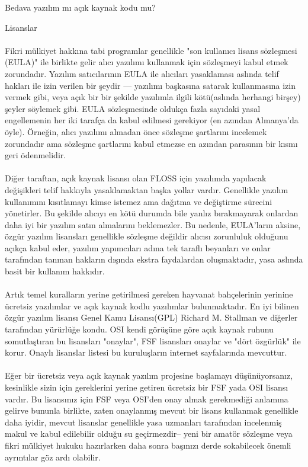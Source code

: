 \documentclass[10pt,a5paper]{book}
\begin{document}
\begin{section}{Bedava yazılım mı açık kaynak kodu mu?}
\begin{subsection}{Lisanslar}
\paragraph{}{Fikri mülkiyet hakkına tabi programlar genellikle "son kullanıcı lisans sözleşmesi (EULA)" ile birlikte gelir alıcı yazılımı kullanmak için  sözleşmeyi kabul etmek zorundadır. Yazılım satıcılarının EULA ile  alıcıları yasaklaması aslında telif hakları ile izin verilen bir şeydir ---
yazılımı başkasına  satarak kullanmasına izin vermek gibi, veya açık bir bir şekilde yazılımla ilgili kötü(aslında herhangi birşey) şeyler söylemek gibi.
EULA  sözleşmesinde oldukça fazla sayıdaki yasal engellemenin her iki tarafça da kabul edilmesi gerekiyor (en azından Almanya'da öyle). Örneğin, alıcı yazılımı almadan önce sözleşme şartlarını incelemek zorundadır ama sözleşme şartlarını kabul etmezse en azından parasının bir kısmı geri ödenmelidir.}
\paragraph{}{Diğer taraftan, açık kaynak lisansı olan FLOSS için yazılımda yapılacak değişikleri telif hakkıyla yasaklamaktan başka yollar vardır. Genellikle yazılım kullanımını kısıtlamayı kimse istemez ama dağıtma ve değiştirme sürecini yönetirler. Bu şekilde alıcıyı en kötü durumda bile yanlız bırakmayarak onlardan daha iyi bir yazılım satın almalarını beklemezler. Bu nedenle, EULA'ların aksine, özgür yazılım lisansları genellikle sözleşme değildir alıcısı zorunluluk olduğunu açıkça kabul eder, yazılım yapımcıları adına tek taraflı beyanları ve onlar tarafından tanınan hakların dışında ekstra faydalardan oluşmaktadır, yasa aslında basit bir kullanım hakkıdır.}
\paragraph{}{Artık temel kuralların yerine getirilmesi gereken hayvanat bahçelerinin yerinine ücretsiz yazılımlar ve  açık kaynak kodlu yazılımlar bulunmaktadır. En iyi bilinen özgür yazılım lisansı Genel Kamu Lisansı(GPL)  Richard M. Stallman ve diğerler tarafından yürürlüğe kondu. OSI kendi görüşüne göre açık kaynak ruhunu somutlaştıran bu lisansları "onaylar", FSF  lisansları onaylar ve "dört özgürlük" ile korur. Onaylı lisanslar listesi bu kuruluşların internet sayfalarında mevcuttur.}
\paragraph{}{Eğer bir ücretsiz veya açık kaynak yazılım projesine başlamayı düşünüyorsanız, kesinlikle sizin için  gereklerini yerine getiren ücretsiz bir FSF yada OSI lisansı vardır. Bu lisansınız için FSF veya OSI'den onay almak gerekmediği anlamına gelirve bununla birlikte, zaten onaylanmış mevcut bir lisans kullanmak genellikle daha iyidir, mevcut lisanslar genellikle yasa uzmanları tarafından incelenmiş makul ve kabul edilebilir olduğu su geçirmezdir--
yeni bir amatör sözleşme veya fikri mülkiyet hukuku hazırlarken daha sonra başınızı derde sokabilecek önemli ayrıntılar göz ardı olabilir.}

\end{subsection}
\end{section}
\end{document}
